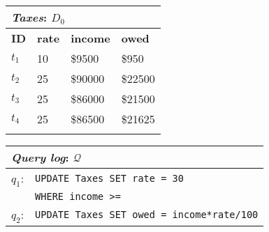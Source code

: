 

\begin{figure*}[t]
    \begin{minipage}[t]{0.28\textwidth}
         \vspace{0pt} 
         \centering
        \begin{tabular}{llll}
            \multicolumn{4}{l}{\emph{Taxes}: $D_0$}\\
            \toprule
            \textbf{ID}  & \textbf{rate}  & \textbf{income}    & \textbf{owed}\\
            \midrule
            $t_1$   & 10    & \$9500    & \$950\\
            $t_2$   & 25    & \$90000   & \$22500\\
            $t_3$   & 25    & \$86000   & \$21500\\
            $t_4$   & 25    & \$86500   & \$21625\\
            \bottomrule
            \\
        \end{tabular}
    \end{minipage}
    \begin{minipage}[t]{0.43\textwidth}
         \vspace{0pt} 
         \centering
        \begin{tabular}{|p{1ex}l|}
            \multicolumn{2}{l}{\emph{Query log}: $\mathcal{Q}$}\\
            \hline
            $q_1$: & \texttt{\small UPDATE Taxes SET rate = 30}\\
                   & \texttt{\small WHERE income >= \color{red}{85700}} \\
            
            $q_2$: & \texttt{\small UPDATE Taxes SET owed = income*rate/100}\\
            

\end{tabular}
\end{minipage}
\end{figure*}
